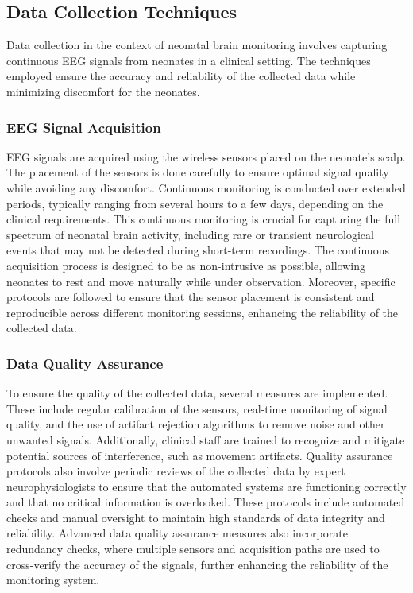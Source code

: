 \documentclass[12pt,journal,compsoc]{IEEEtran}
\begin{document}
\subsection{Data Collection Techniques}

Data collection in the context of neonatal brain monitoring involves capturing continuous EEG signals from neonates in a clinical setting. The techniques employed ensure the accuracy and reliability of the collected data while minimizing discomfort for the neonates.

\subsubsection{EEG Signal Acquisition}

EEG signals are acquired using the wireless sensors placed on the neonate’s scalp. The placement of the sensors is done carefully to ensure optimal signal quality while avoiding any discomfort. Continuous monitoring is conducted over extended periods, typically ranging from several hours to a few days, depending on the clinical requirements. This continuous monitoring is crucial for capturing the full spectrum of neonatal brain activity, including rare or transient neurological events that may not be detected during short-term recordings. The continuous acquisition process is designed to be as non-intrusive as possible, allowing neonates to rest and move naturally while under observation. Moreover, specific protocols are followed to ensure that the sensor placement is consistent and reproducible across different monitoring sessions, enhancing the reliability of the collected data.

\subsubsection{Data Quality Assurance}

To ensure the quality of the collected data, several measures are implemented. These include regular calibration of the sensors, real-time monitoring of signal quality, and the use of artifact rejection algorithms to remove noise and other unwanted signals. Additionally, clinical staff are trained to recognize and mitigate potential sources of interference, such as movement artifacts. Quality assurance protocols also involve periodic reviews of the collected data by expert neurophysiologists to ensure that the automated systems are functioning correctly and that no critical information is overlooked. These protocols include automated checks and manual oversight to maintain high standards of data integrity and reliability. Advanced data quality assurance measures also incorporate redundancy checks, where multiple sensors and acquisition paths are used to cross-verify the accuracy of the signals, further enhancing the reliability of the monitoring system.
\end{document}
